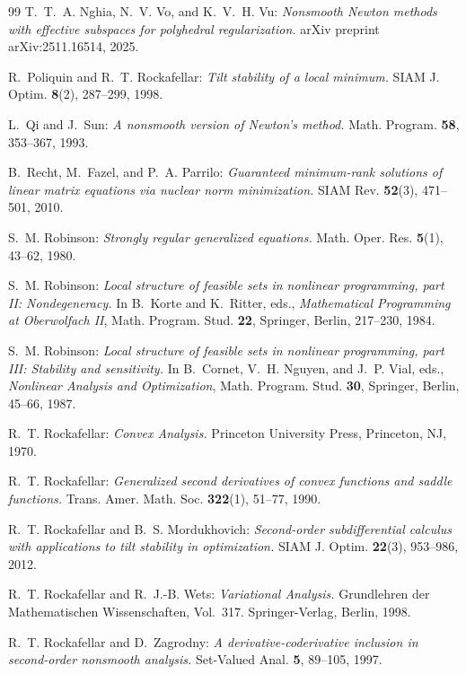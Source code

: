 \documentclass[reqno]{amsart}
\numberwithin{equation}{section}
\begin{document}
\begin{thebibliography}{99}
{\sc T.~T.~A. Nghia, N.~V. Vo, and K.~V.~H. Vu:}
{\em Nonsmooth Newton methods with effective subspaces for polyhedral regularization.}
arXiv preprint arXiv:2511.16514, 2025.

{\sc R.~Poliquin and R.~T. Rockafellar:}
{\em Tilt stability of a local minimum.}
SIAM J. Optim. {\bf 8}(2), 287--299, 1998.

{\sc L.~Qi and J.~Sun:}
{\em A nonsmooth version of Newton's method.}
Math. Program. {\bf 58}, 353--367, 1993.

{\sc B.~Recht, M.~Fazel, and P.~A. Parrilo:}
{\em Guaranteed minimum-rank solutions of linear matrix equations via nuclear norm minimization.}
SIAM Rev. {\bf 52}(3), 471--501, 2010.

{\sc S.~M. Robinson:}
{\em Strongly regular generalized equations.}
Math. Oper. Res. {\bf 5}(1), 43--62, 1980.

{\sc S.~M. Robinson:}
{\em Local structure of feasible sets in nonlinear programming, part II: Nondegeneracy.}
In B.~Korte and K.~Ritter, eds., {\em Mathematical Programming at Oberwolfach II}, Math. Program. Stud. {\bf 22}, Springer, Berlin, 217--230, 1984.

{\sc S.~M. Robinson:}
{\em Local structure of feasible sets in nonlinear programming, part III: Stability and sensitivity.}
In B.~Cornet, V.~H. Nguyen, and J.~P. Vial, eds., {\em Nonlinear Analysis and Optimization}, Math. Program. Stud. {\bf 30}, Springer, Berlin, 45--66, 1987.

{\sc R.~T. Rockafellar:}
{\em Convex Analysis.}
Princeton University Press, Princeton, NJ, 1970.

{\sc R.~T. Rockafellar:}
{\em Generalized second derivatives of convex functions and saddle functions.}
Trans. Amer. Math. Soc. {\bf 322}(1), 51--77, 1990.

{\sc R.~T. Rockafellar and B.~S. Mordukhovich:}
{\em Second-order subdifferential calculus with applications to tilt stability in optimization.}
SIAM J. Optim. {\bf 22}(3), 953--986, 2012.

{\sc R.~T. Rockafellar and R.~J.-B. Wets:}
{\em Variational Analysis.}
Grundlehren der Mathematischen Wissenschaften, Vol.~317. Springer-Verlag, Berlin, 1998.

{\sc R.~T. Rockafellar and D.~Zagrodny:}
{\em A derivative-coderivative inclusion in second-order nonsmooth analysis.}
Set-Valued Anal. {\bf 5}, 89--105, 1997.


\end{thebibliography}
\end{document}
